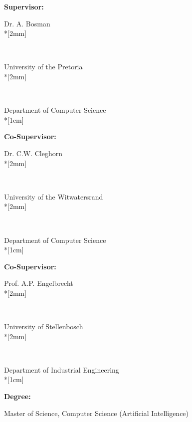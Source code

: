 \pagestyle{empty}
\vspace*{\fill}
\noindent
\parbox{4cm}{\textbf{Supervisor:}} Dr. A. Bosman \\*[2mm]
\parbox{4cm}{\textbf{~}} University of the Pretoria \\*[2mm]
\parbox{4cm}{\textbf{~}} Department of Computer Science\\*[1cm]
\parbox{4cm}{\textbf{Co-Supervisor:}} Dr. C.W. Cleghorn \\*[2mm]
\parbox{4cm}{\textbf{~}} University of the Witwatersrand\\*[2mm]
\parbox{4cm}{\textbf{~}} Department of Computer Science\\*[1cm]
\parbox{4cm}{\textbf{Co-Supervisor:}} Prof. A.P. Engelbrecht \\*[2mm]
\parbox{4cm}{\textbf{~}} University of Stellenbosch\\*[2mm]
\parbox{4cm}{\textbf{~}} Department of Industrial Engineering\\*[1cm]
\parbox{4cm}{\textbf{Degree:}} Master of Science, Computer Science (Artificial
Intelligence)
\newpage
